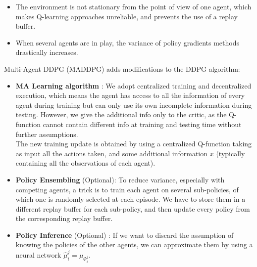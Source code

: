 \documentclass[10pt,landscape]{article}
\begin{document}
\begin{multicols}{3}
\begin{itemize}[leftmargin=*]
    \item The environment is not stationary from the point of view of one agent, which makes Q-learning approaches unreliable, and prevents the use of a replay buffer.
    \item When several agents are in play, the variance of policy gradients methods drastically increases.
\end{itemize}
\medskip
Multi-Agent DDPG (MADDPG) adds modifications to the DDPG algorithm:\\
\begin{itemize}[leftmargin=*]
   \item \textbf{MA Learning algorithm} : We adopt centralized training and decentralized execution, which means the agent has access to all the information of every agent during training but can only use its own incomplete information during testing. However, we give the additional info only to the critic, as the Q-function cannot contain different info at training and testing time without further assumptions.\\
    The new training update is obtained by using a centralized Q-function taking as input all the actions taken, and some additional information $x$ (typically containing all the observations of each agent).
    \item \textbf{Policy Ensembling} (Optional): To reduce variance, especially with competing agents, a trick is to train each agent on several sub-policies, of which one is randomly selected at each episode. We have to store them in a different replay buffer for each sub-policy, and then update every policy from the corresponding replay buffer.
    \item \textbf{Policy Inference} (Optional) : If we want to discard the assumption of knowing the policies of the other agents, we can approximate them by using a neural network $\hat{\mu}_i^j = \mu_{\Phi_i^j}$.
\end{itemize}


\end{multicols}
\newpage
\end{document}
